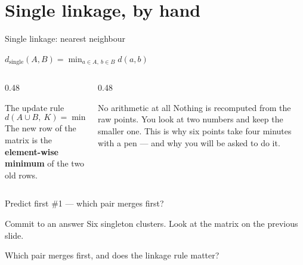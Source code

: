 \documentclass[aspectratio=169]{beamer}
\begin{document}
\section[Single linkage]{Single linkage, by hand}
\label{sec:single}

\begin{frame}{Single linkage: nearest neighbour}
  \begin{exampleblock}{}
    \centering\large
    $d_{\text{single}}(A,B) = \displaystyle\min_{a \in A,\ b \in B} d(a,b)$
  \end{exampleblock}
  \begin{columns}[T]
    \begin{column}{0.48\textwidth}
      \begin{block}{The update rule}
        \[
          d(A \cup B,\ K) = \min\bigl(d(A,K),\ d(B,K)\bigr)
        \]
        The new row of the matrix is the \textbf{element-wise minimum} of the
        two old rows.
      \end{block}
    \end{column}
    \begin{column}{0.48\textwidth}
      \begin{alertblock}{No arithmetic at all}
        Nothing is recomputed from the raw points. You look at two numbers and
        keep the smaller one. This is why six points take four minutes with a
        pen --- and why you will be asked to do it.
      \end{alertblock}
    \end{column}
  \end{columns}
\end{frame}

\begin{frame}{Predict first \#1 --- which pair merges first?}
  \begin{alertblock}{Commit to an answer}
    Six singleton clusters. Look at the matrix on the previous slide.

    \medskip
    \centering\large
    Which pair merges first, and does the linkage rule matter?
  \end{alertblock}
\end{frame}
\end{document}
